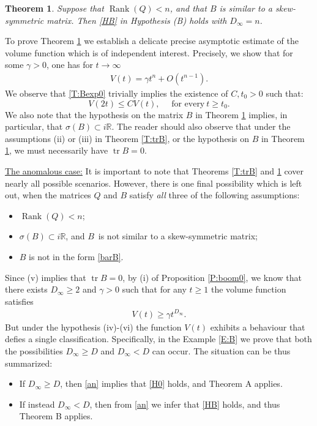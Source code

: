 \documentclass[11pt,letter]{amsart}
\def \R {\mathbb{R}}
\numberwithin{equation}{section}
\newcommand{\tr}{\operatorname{tr}}
\newtheorem{theorem}{Theorem}[section]
\numberwithin{equation}{section}
\begin{document}
\begin{theorem}\label{T:B}
Suppose that $\operatorname{Rank}(Q)<n$, and that $B$ is similar to a skew-symmetric matrix. Then \eqref{HB} in \emph{Hypothesis (B)} holds with $D_\infty = n$.
\end{theorem}

To prove Theorem \ref{T:B} we establish a delicate precise asymptotic estimate of the volume function which is of independent interest. Precisely, we show that for some $\gamma>0$, one has for $t\to \infty$
\begin{align}\label{T:Bexp0}
V(t)= \gamma t^{n}+O(t^{n-1}).
\end{align}
We observe that \eqref{T:Bexp0} trivially implies the existence of  $C, t_0>0$ such that:
\[
V(2t)\le C V(t),\ \ \ \ \ \  \text{for every}\ t\ge t_0.
\]
We also note that the hypothesis on the matrix $B$ in Theorem \ref{T:B} implies, in particular, that $\sigma(B)\subset i \R$. The reader should also observe that under the assumptions (ii) or (iii) in Theorem \ref{T:trB}, or the hypothesis on $B$ in Theorem \ref{T:B}, we must necessarily have $\tr B = 0$. 


\vskip 0.2in

\noindent \underline{The anomalous case:} It is important to note that Theorems \ref{T:trB} and  \ref{T:B} cover nearly all possible scenarios. However, there is one final possibility which is left out, when the matrices $Q$ and $B$ satisfy \emph{all} three of the following assumptions: 
\begin{itemize}
\item[(iv)] $\operatorname{Rank}(Q)<n$; 
\item[(v)] $\sigma(B)\subset i \R$, and $B$\ is not similar to a skew-symmetric matrix; 
\item[(vi)] $B$ is not in the form \eqref{barB}.
\end{itemize}
Since (v) implies that $\tr B=0$, by (i) of Proposition \ref{P:boom0}, we know that there exists $ D_{\infty}\ge 2$ and $\gamma>0$ such that for any $t\ge1$ the volume function satisfies
\begin{align}\label{an}
V(t)\ge \gamma t^{D_{\infty}}.
\end{align}
But under the hypothesis (iv)-(vi)
the function $V(t)$ exhibits a behaviour that defies a single classification. Specifically, in the Example \ref{E:B} we prove that both the possibilities
$D_\infty \ge D$ and $D_\infty < D$ can occur. The situation can be thus summarized:
\begin{itemize}
\item[(A)] If $D_\infty \ge D$, then \eqref{an} implies that \eqref{H0} holds, and Theorem A applies. 
\item[(B)] If instead $D_\infty <D$, then from \eqref{an} we infer that \eqref{HB} holds, and thus Theorem B applies.
\end{itemize}
\end{document}
